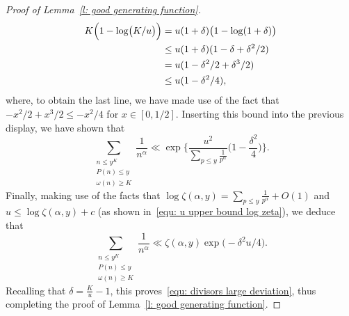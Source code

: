 \documentclass[a4paper,12pt,reqno]{amsart}
\begin{document}
\begin{proof}[Proof of Lemma~\ref{l: good generating function}]
\begin{align*}
K \Bigl( 1 - \log \bigl( K / u \bigr) \Bigr) &= u (1 + \delta) \bigl( 1 - \log (1 + \delta) \bigr) \\
& \leq u (1 + \delta) (1 - \delta + \delta^2/2) \\
& = u (1 - \delta^2/2 +\delta^3/2) \\
& \leq u (1 - \delta^2/4),
\end{align*}
where, to obtain the last line, we have made use of the fact that $-x^2/2 + x^3/2 \leq -x^2/4$ for $x \in [0,1/2]$. Inserting this bound into the previous display, we have shown that
\[
\sum_{\substack{n \leq y^K \\ P(n) \leq y \\ \omega(n) \geq K}} \frac{1}{n^{\alpha}} \ll \exp \biggl\{ \frac{u^2}{\sum_{p \leq y} \frac{1}{p^{\alpha}}} \biggl( 1 - \frac{\delta^2}{4} \biggr) \biggr\}.
\]
Finally, making use of the facts that $\log \zeta (\alpha, y) = \sum_{p \leq y} \frac{1}{p^\alpha} + O(1)$ and $u \leq \log \zeta(\alpha,y) + c$ (as shown in~\eqref{equ: u upper bound log zeta}), we deduce that
\[
\sum_{\substack{n \leq y^K \\ P(n) \leq y \\ \omega(n) \geq K}} \frac{1}{n^{\alpha}} \ll \zeta (\alpha, y) \exp \bigl( -\delta^2 u / 4 \bigr).
\]
Recalling that $\delta = \frac{K}{u}-1$, this proves~\eqref{equ: divisors large deviation}, thus completing the proof of Lemma~\ref{l: good generating function}.
\end{proof}
\end{document}
